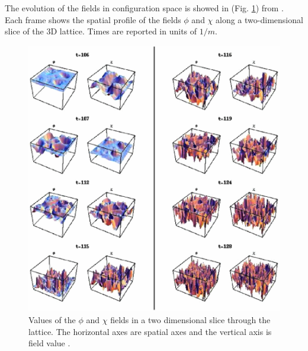 \documentclass[11pt,a4paper,twoside]{book}
\begin{document}
The evolution of the fields in configuration space is showed in (Fig. \ref{fig:fragmentationfig4}) from \cite{Chap5:Fragmentation}. Each frame shows the spatial profile of the fields $\phi$ and $\chi$ along a two-dimensional slice of the 3D lattice. Times are reported in units of $ 1/m $.\\
\begin{figure}[h]
	\centering
	\includegraphics[width=0.75\linewidth, height=0.6\textheight]{Images/Chap5/Fragmentation_Fig4}
	\caption{Values of the $\phi$ and $\chi$ fields in a two dimensional slice through the lattice. The horizontal axes are spatial axes and the vertical axis is field value \cite{Chap5:Fragmentation}.}
	\label{fig:fragmentationfig4}
\end{figure}
\end{document}
